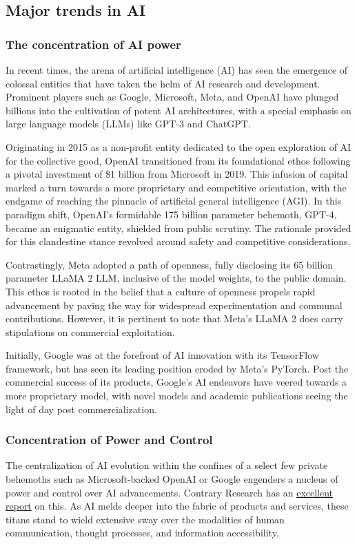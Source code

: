 

\subsection{Major trends in AI}
\subsubsection{The concentration of AI power}
In recent times, the arena of artificial intelligence (AI) has seen the emergence of colossal entities that have taken the helm of AI research and development. Prominent players such as Google, Microsoft, Meta, and OpenAI have plunged billions into the cultivation of potent AI architectures, with a special emphasis on large language models (LLMs) like GPT-3 and ChatGPT.

Originating in 2015 as a non-profit entity dedicated to the open exploration of AI for the collective good, OpenAI transitioned from its foundational ethos following a pivotal investment of \$1 billion from Microsoft in 2019. This infusion of capital marked a turn towards a more proprietary and competitive orientation, with the endgame of reaching the pinnacle of artificial general intelligence (AGI). In this paradigm shift, OpenAI's formidable 175 billion parameter behemoth, GPT-4, became an enigmatic entity, shielded from public scrutiny. The rationale provided for this clandestine stance revolved around safety and competitive considerations.

Contrastingly, Meta adopted a path of openness, fully disclosing its 65 billion parameter LLaMA 2 LLM, inclusive of the model weights, to the public domain. This ethos is rooted in the belief that a culture of openness propels rapid advancement by paving the way for widespread experimentation and communal contributions. However, it is pertinent to note that Meta's LLaMA 2 does carry stipulations on commercial exploitation.

Initially, Google was at the forefront of AI innovation with its TensorFlow framework, but has seen its leading position eroded by Meta's PyTorch. Post the commercial success of its products, Google's AI endeavors have veered towards a more proprietary model, with novel models and academic publications seeing the light of day post commercialization.

\subsubsection{Concentration of Power and Control}
The centralization of AI evolution within the confines of a select few private behemoths such as Microsoft-backed OpenAI or Google engenders a nucleus of power and control over AI advancements. Contrary Research has an \href{https://research.contrary.com/reports/the-openness-of-ai}{excellent report} on this. As AI melds deeper into the fabric of products and services, these titans stand to wield extensive sway over the modalities of human communication, thought processes, and information accessibility.

